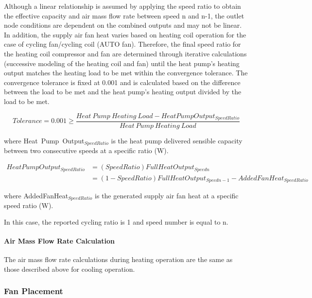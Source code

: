 Although a linear relationship is assumed by applying the speed ratio to obtain the effective capacity and air mass flow rate between speed n and n-1, the outlet node conditions are dependent on the combined outputs and may not be linear. In addition, the supply air fan heat varies based on heating coil operation for the case of cycling fan/cycling coil (AUTO fan). Therefore, the final speed ratio for the heating coil compressor and fan are determined through iterative calculations (successive modeling of the heating coil and fan) until the heat pump's heating output matches the heating load to be met within the convergence tolerance. The convergence tolerance is fixed at 0.001 and is calculated based on the difference between the load to be met and the heat pump's heating output divided by the load to be met.

\begin{equation}
Tolerance = 0.001 \ge \frac{{Heat~Pump~Heating~Load - HeatPumpOutpu{t_{SpeedRatio}}}}{{Heat~Pump~Heating~Load}}
\end{equation}

where Heat~Pump~Output\(_{SpeedRatio}\) is the heat pump delivered sensible capacity between two consecutive speeds at a specific ratio (W).

\begin{equation}
\begin{array}{rl}
HeatPumpOutpu{t_{SpeedRatio}} &= (SpeedRatio)FullHeatOutpu{t_{Speedn}} \\
 &= (1 - SpeedRatio)FullHeatOutpu{t_{Speedn-1}} - AddedFanHea{t_{SpeedRatio}}
 \end{array}
\end{equation}

where AddedFanHeat\(_{SpeedRatio}\) is the generated supply air fan heat at a specific speed ratio (W).

In this case, the reported cycling ratio is 1 and speed number is equal to n.

\paragraph{Air Mass Flow Rate Calculation}\label{air-mass-flow-rate-calculation-3}

The air mass flow rate calculations during heating operation are the same as those described above for cooling operation.

\subsubsection{Fan Placement}\label{fan-placement}

